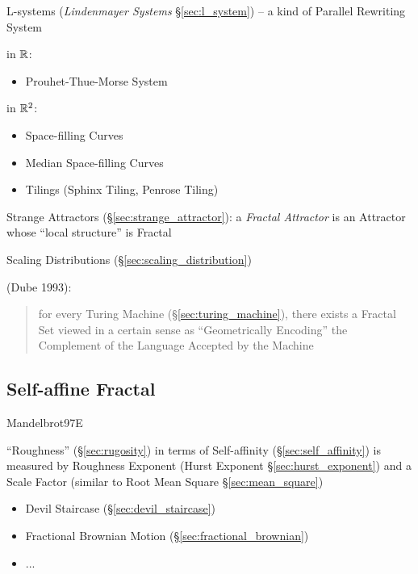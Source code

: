 \asterism

L-systems (\emph{Lindenmayer Systems} \S\ref{sec:l_system}) -- a kind of
Parallel Rewriting System


in $\mathbb{R}$:
\begin{itemize}
  \item Prouhet-Thue-Morse System
\end{itemize}

in $\mathbb{R}^2$:
\begin{itemize}
  \item Space-filling Curves
  \item Median Space-filling Curves
  \item Tilings (Sphinx Tiling, Penrose Tiling)
\end{itemize}

\fist Strange Attractors (\S\ref{sec:strange_attractor}): a \emph{Fractal
  Attractor} is an Attractor whose ``local structure'' is Fractal

\fist Scaling Distributions (\S\ref{sec:scaling_distribution})

\asterism

(Dube 1993):
\begin{quote}
  for every Turing Machine (\S\ref{sec:turing_machine}), there exists a Fractal
  Set viewed in a certain sense as ``Geometrically Encoding'' the Complement of
  the Language Accepted by the Machine
\end{quote}



\subsection{Self-affine Fractal}\label{sec:selfaffine_fractal}

Mandelbrot97E

``Roughness'' (\S\ref{sec:rugosity}) in terms of Self-affinity
(\S\ref{sec:self_affinity}) is measured by Roughness Exponent (Hurst Exponent
\S\ref{sec:hurst_exponent}) and a Scale Factor (similar to Root Mean Square
\S\ref{sec:mean_square})

\begin{itemize}
  \item Devil Staircase (\S\ref{sec:devil_staircase})
  \item Fractional Brownian Motion (\S\ref{sec:fractional_brownian})
  \item ...
\end{itemize}

